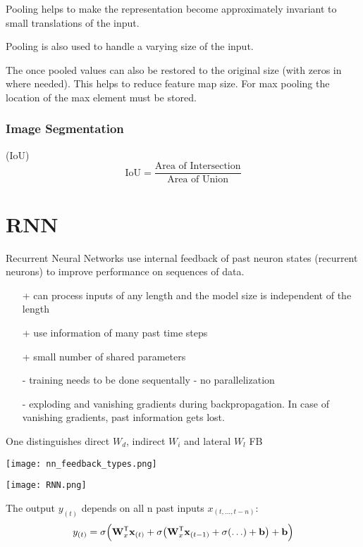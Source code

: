 Pooling helps to make the representation become approximately invariant to small translations of the input.

Pooling is also used to handle a varying size of the input.

\newpar{}

The once pooled values can also be restored to the original size (with zeros in where needed). This helps to reduce feature map size. For max pooling the location of the max element must be stored.

\subsubsection{Image Segmentation}

 (IoU)
\begin{equation*}
    \text{IoU} = \frac{\text{Area of Intersection}}{\text{Area of Union}}
\end{equation*}


\section{RNN}\label{sec:RNN}
Recurrent Neural Networks use internal feedback of past neuron states (recurrent neurons) to improve performance on sequences of data.
\begin{itemize}
    \item[+] can process inputs of any length and the model size is independent of the length
    \item[+] use information of many past time steps
    \item[+] small number of shared parameters
    \item[-] training needs to be done sequentally - no parallelization
    \item[-] exploding and vanishing gradients during backpropagation. In case of vanishing gradients, past information gets lost.
\end{itemize}
\newpar{}

One distinguishes direct $W_d$, indirect $W_i$ and lateral $W_l$ FB
\begin{center}
    \texttt{[image: nn\_feedback\_types.png]}
\end{center}
\newpar{}
\begin{center}
    \texttt{[image: RNN.png]}
\end{center}
The output $y_{(t)}$ depends on all n past inputs $x_{(t,\ldots,t-n)}$:
\noindent\begin{equation*}
    y_{(t)} = \sigma\Bigl(\mathbf{W}_x^{\mathsf{T}}\mathbf{x}_{(t)} + \sigma\bigl(\mathbf{W}_x^{\mathsf{T}}\mathbf{x}_{(t-1)} + \sigma( \ldots ) + \mathbf{b}\bigr) + \mathbf{b}\Bigr)
\end{equation*}

